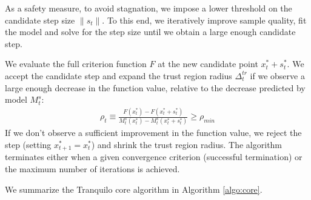 As a safety measure, to avoid stagnation, we impose a lower threshold on the candidate step size $\lVert s_t\rVert$. To this end, we iteratively improve sample quality, fit the model and solve for the step size until we obtain a large enough candidate step.

We evaluate the full criterion function $F$ at the new candidate point $x^{*}_t+s^{*}_t$. We accept the candidate step and expand the trust region radius $\Delta_t^{tr}$ if we observe a large enough decrease in the function value, relative to the decrease predicted by model $M_t^s$:
\begin{align}
    \rho_t\equiv\frac{F(x^*_t)-F(x^{*}_t+s^{*}_t)}{M^s_t(x^{*}_t)-M^s_t(x^{*}_t+s^{*}_t)}\geq\rho_{min}
    \label{eq:rho}
\end{align}
If we don't observe a sufficient improvement in the function value, we reject the step (setting $x^{*}_{t+1}=x_t^{*}$) and shrink the trust region radius. The algorithm terminates either when a given convergence criterion (successful termination) or the maximum number of iterations is achieved.

We summarize the Tranquilo core algorithm in Algorithm \ref{algo:core}.

